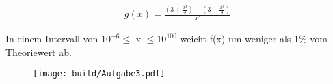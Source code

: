 \begin{align*}
	g(x) = \frac{(3 + \frac{x³}{3}) - (3 - \frac{x³}{3})}{x³}
\end{align*}

In einem Intervall von $10^{-6} \le$ x $\le 10^{100}$ weicht f(x) um weniger als 1\% vom Theoriewert ab. \\

\begin{figure}
	\centering
	\texttt{[image: build/Aufgabe3.pdf]}
\end{figure}
























%
